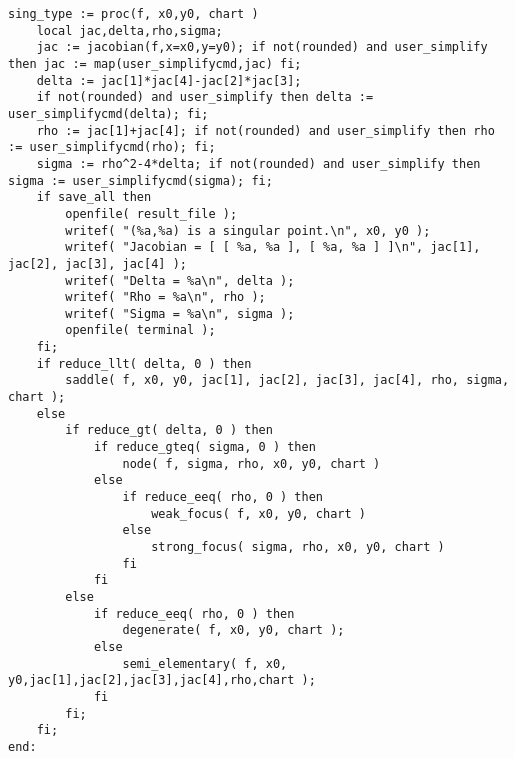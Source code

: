 \documentclass[a4paper,10pt]{article}
\begin{document}
\begin{lstlisting}[name=type]
sing_type := proc(f, x0,y0, chart )
    local jac,delta,rho,sigma;
    jac := jacobian(f,x=x0,y=y0); if not(rounded) and user_simplify then jac := map(user_simplifycmd,jac) fi;
    delta := jac[1]*jac[4]-jac[2]*jac[3];
    if not(rounded) and user_simplify then delta := user_simplifycmd(delta); fi;
    rho := jac[1]+jac[4]; if not(rounded) and user_simplify then rho := user_simplifycmd(rho); fi;
    sigma := rho^2-4*delta; if not(rounded) and user_simplify then sigma := user_simplifycmd(sigma); fi;
    if save_all then
        openfile( result_file );
        writef( "(%a,%a) is a singular point.\n", x0, y0 );
        writef( "Jacobian = [ [ %a, %a ], [ %a, %a ] ]\n", jac[1], jac[2], jac[3], jac[4] );
        writef( "Delta = %a\n", delta );
        writef( "Rho = %a\n", rho );
        writef( "Sigma = %a\n", sigma );
        openfile( terminal );
    fi;
    if reduce_llt( delta, 0 ) then
        saddle( f, x0, y0, jac[1], jac[2], jac[3], jac[4], rho, sigma, chart );
    else
        if reduce_gt( delta, 0 ) then
            if reduce_gteq( sigma, 0 ) then
                node( f, sigma, rho, x0, y0, chart )
            else
                if reduce_eeq( rho, 0 ) then
                    weak_focus( f, x0, y0, chart )
                else
                    strong_focus( sigma, rho, x0, y0, chart )
                fi
            fi
        else
            if reduce_eeq( rho, 0 ) then
                degenerate( f, x0, y0, chart );
            else
                semi_elementary( f, x0, y0,jac[1],jac[2],jac[3],jac[4],rho,chart );
            fi
        fi;
    fi;
end:
\end{lstlisting}
\end{document}
